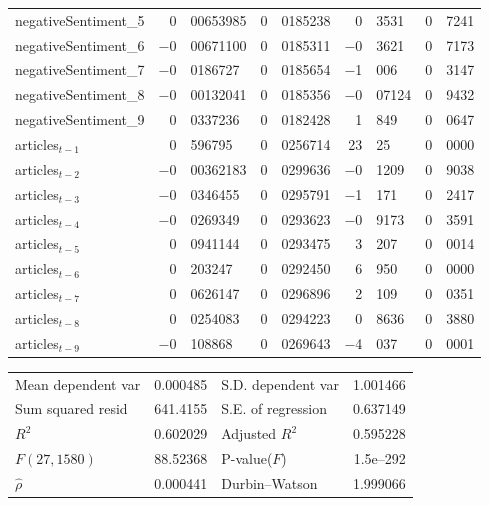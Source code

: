 \begin{center}
\begin{longtable}{lr@{.}lr@{.}lr@{.}lr@{.}l}
negativeSentiment\_5 &
    0&00653985 &
    0&0185238 &
        0&3531 &
        0&7241 \\
negativeSentiment\_6 &
    $-$0&00671100 &
    0&0185311 &
        $-$0&3621 &
        0&7173 \\
negativeSentiment\_7 &
    $-$0&0186727 &
    0&0185654 &
        $-$1&006 &
        0&3147 \\
negativeSentiment\_8 &
    $-$0&00132041 &
    0&0185356 &
        $-$0&07124 &
        0&9432 \\
negativeSentiment\_9 &
    0&0337236 &
    0&0182428 &
        1&849 &
        0&0647 \\
articles$_{t-1}$ &
    0&596795 &
    0&0256714 &
        23&25 &
        0&0000 \\
articles$_{t-2}$ &
    $-$0&00362183 &
    0&0299636 &
        $-$0&1209 &
        0&9038 \\
articles$_{t-3}$ &
    $-$0&0346455 &
    0&0295791 &
        $-$1&171 &
        0&2417 \\
articles$_{t-4}$ &
    $-$0&0269349 &
    0&0293623 &
        $-$0&9173 &
        0&3591 \\
articles$_{t-5}$ &
    0&0941144 &
    0&0293475 &
        3&207 &
        0&0014 \\
articles$_{t-6}$ &
    0&203247 &
    0&0292450 &
        6&950 &
        0&0000 \\
articles$_{t-7}$ &
    0&0626147 &
    0&0296896 &
        2&109 &
        0&0351 \\
articles$_{t-8}$ &
    0&0254083 &
    0&0294223 &
        0&8636 &
        0&3880 \\
articles$_{t-9}$ &
    $-$0&108868 &
    0&0269643 &
        $-$4&037 &
        0&0001 \\
\end{longtable}

\begin{tabular}{lrlr}
Mean dependent var &  0.000485 & S.D. dependent var &  1.001466 \\
Sum squared resid &  641.4155 & S.E. of regression &  0.637149 \\
$R^2$ &  0.602029 & Adjusted $R^2$ &  0.595228 \\
$F(27, 1580)$ &  88.52368 & P-value($F$) &  1.5\textrm{e--292} \\
$\hat{\rho}$ &  0.000441 & Durbin--Watson &  1.999066 \\
\end{tabular}

\end{center}

